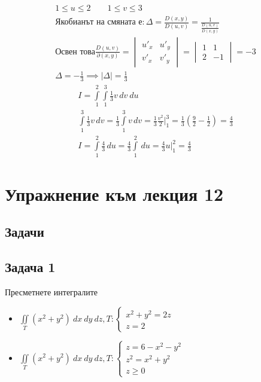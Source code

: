 \documentclass[a4paper,fleqn,12pt]{article}
\theoremstyle{definition}
\begin{document}
\begin{itemize}
\begin{gather*}
1 \leq u \leq 2 \qquad 1 \leq v \leq 3 \\
\text{Якобианът на смяната е}:
\Delta = \frac{D(x,y)}{D(u,v)} = \frac{1}{\frac{D(u,v)}{D(x,y)}}\\
\text{Освен това}
\frac{D(u,v)}{\partial (x,y)} = \begin{vmatrix} u'_x & u'_y \\ v'_x & v'_y \end{vmatrix} =  \begin{vmatrix} 1 & 1\\ 2 & -1 \end{vmatrix} =-3 \\
\Delta = - \frac{1}{3} \implies |\Delta| = \frac{1}{3} 
\end{gather*}
\begin{gather*}
I = \int\limits_1 ^2 \int\limits_1 ^3 \frac{1}{3}v \, dv \ du \\
\int\limits_1 ^3 \frac{1}{3}v \, dv  =
\frac{1}{3} \int\limits_1 ^3 v \, dv =
\frac{1}{3} \frac{v^2}{2} \Big|_1 ^3 = 
\frac{1}{3} \left( \frac{9}{2} - \frac{1}{2}\right) = \frac{4}{3} \\
I = \int\limits_1 ^2  \frac{4}{3} \, du = 
\frac{4}{3} \int\limits_1 ^2  \, du = 
\frac{4}{3} u\Big|_1 ^2 = \frac{4}{3}
\end{gather*}
\end{itemize}

\newpage 
\section{Упражнение към лекция 12}

\subsection{Задачи}

\subsection*{Задача 1}
Пресметнете интегралите 
\begin{itemize}
\item $\iint\limits_{T} (x^2 + y^2 ) \ dx \ dy \ dz, 
T: \begin{cases} x^2 + y^2 = 2z \\ z = 2 \end{cases}$
\item $\iint\limits_{T} (x^2 + y^2 ) \ dx \ dy \ dz, 
T: \begin{cases} z= 6-x^2 - y^2 \\ z^2 = x^2 + y^2 \\ z \geq 0 \end{cases}$
\end{itemize}
\end{document}
